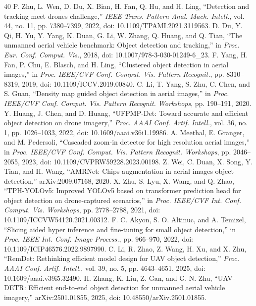 \documentclass[journal]{IEEEtran}
\begin{document}
\begin{thebibliography}{40}
 P. Zhu, L. Wen, D. Du, X. Bian, H. Fan, Q. Hu, and H. Ling, ``Detection and tracking meet drones challenge,'' \emph{IEEE Trans. Pattern Anal. Mach. Intell.}, vol. 44, no. 11, pp. 7380--7399, 2022, doi: 10.1109/TPAMI.2021.3119563.
 D. Du, Y. Qi, H. Yu, Y. Yang, K. Duan, G. Li, W. Zhang, Q. Huang, and Q. Tian, ``The unmanned aerial vehicle benchmark: Object detection and tracking,'' in \emph{Proc. Eur. Conf. Comput. Vis.}, 2018, doi: 10.1007/978-3-030-01249-6\_23.
 F. Yang, H. Fan, P. Chu, E. Blasch, and H. Ling, ``Clustered object detection in aerial images,'' in \emph{Proc. IEEE/CVF Conf. Comput. Vis. Pattern Recognit.}, pp. 8310--8319, 2019, doi: 10.1109/ICCV.2019.00840.
 C. Li, T. Yang, S. Zhu, C. Chen, and S. Guan, ``Density map guided object detection in aerial images,'' in \emph{Proc. IEEE/CVF Conf. Comput. Vis. Pattern Recognit. Workshops}, pp. 190--191, 2020.
 Y. Huang, J. Chen, and D. Huang, ``UFPMP-Det: Toward accurate and efficient object detection on drone imagery,'' \emph{Proc. AAAI Conf. Artif. Intell.}, vol. 36, no. 1, pp. 1026--1033, 2022, doi: 10.1609/aaai.v36i1.19986.
 A. Meethal, E. Granger, and M. Pedersoli, ``Cascaded zoom-in detector for high resolution aerial images,'' in \emph{Proc. IEEE/CVF Conf. Comput. Vis. Pattern Recognit. Workshops}, pp. 2046--2055, 2023, doi: 10.1109/CVPRW59228.2023.00198.
 Z. Wei, C. Duan, X. Song, Y. Tian, and H. Wang, ``AMRNet: Chips augmentation in aerial images object detection,'' arXiv:2009.07168, 2020.
 X. Zhu, S. Lyu, X. Wang, and Q. Zhao, ``TPH-YOLOv5: Improved YOLOv5 based on transformer prediction head for object detection on drone-captured scenarios,'' in \emph{Proc. IEEE/CVF Int. Conf. Comput. Vis. Workshops}, pp. 2778--2788, 2021, doi: 10.1109/ICCVW54120.2021.00312.
 F. C. Akyon, S. O. Altinuc, and A. Temizel, ``Slicing aided hyper inference and fine-tuning for small object detection,'' in \emph{Proc. IEEE Int. Conf. Image Process.}, pp. 966--970, 2022, doi: 10.1109/ICIP46576.2022.9897990.
 C. Li, R. Zhao, Z. Wang, H. Xu, and X. Zhu, ``RemDet: Rethinking efficient model design for UAV object detection,'' \emph{Proc. AAAI Conf. Artif. Intell.}, vol. 39, no. 5, pp. 4643--4651, 2025, doi: 10.1609/aaai.v39i5.32490.
 H. Zhang, K. Liu, Z. Gan, and G.-N. Zhu, ``UAV-DETR: Efficient end-to-end object detection for unmanned aerial vehicle imagery,'' arXiv:2501.01855, 2025, doi: 10.48550/arXiv.2501.01855.

\end{thebibliography}
\end{document}
